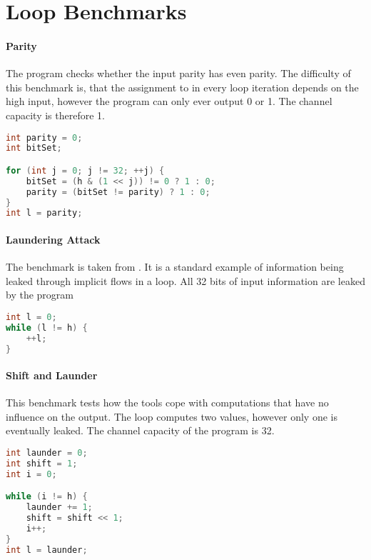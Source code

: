 \section{Loop Benchmarks}

\paragraph{Parity} The program checks whether the input parity has even parity. The difficulty of this benchmark is, that the assignment to in every loop iteration depends on the high input, however the program can only ever output 0 or 1. The channel capacity is therefore 1.

\begin{center}
    \begin{lstlisting}[language=C, caption=Parity, captionpos=b]
int parity = 0;
int bitSet;

for (int j = 0; j != 32; ++j) {
	bitSet = (h & (1 << j)) != 0 ? 1 : 0;
	parity = (bitSet != parity) ? 1 : 0;
}
int l = parity;
    \end{lstlisting}
\end{center}

\paragraph{Laundering Attack} The benchmark is taken from \cite{backes09}. It is a standard example of information being leaked through implicit flows in a loop. All 32 bits of input information are leaked by the program
\begin{center}
    \begin{lstlisting}[language=C, caption=Laundering Attack, captionpos=b]
int l = 0;
while (l != h) {
    ++l;
}
    \end{lstlisting}
\end{center}

\paragraph{Shift and Launder}
This benchmark tests how the tools cope with computations that have no influence on the output. The loop computes two values, however only one is eventually leaked. The channel capacity of the program is 32. 

\begin{center}
    \begin{lstlisting}[language=C, caption=Shift and Launder, captionpos=b]
int launder = 0;
int shift = 1;
int i = 0;

while (i != h) {
	launder += 1;
	shift = shift << 1;
	i++;
}
int l = launder;
    \end{lstlisting}
\end{center}


